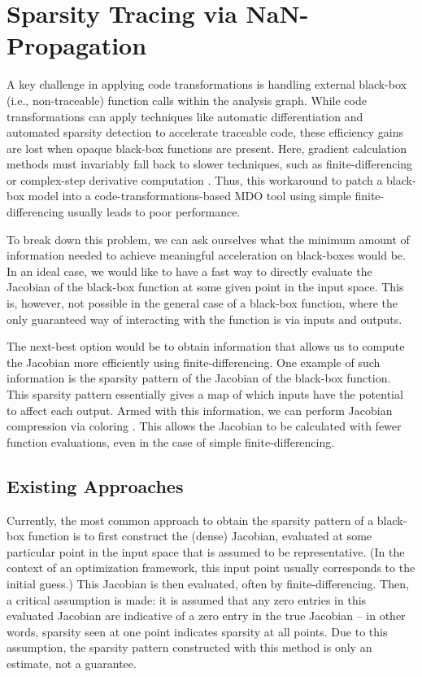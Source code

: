 \chapter{Sparsity Tracing via NaN-Propagation}
\label{sec:nan_propagation}

A key challenge in applying code transformations is handling external black-box (i.e., non-traceable) function calls within the analysis graph. While code transformations can apply techniques like automatic differentiation and automated sparsity detection to accelerate traceable code, these efficiency gains are lost when opaque black-box functions are present. Here, gradient calculation methods must invariably fall back to slower techniques, such as finite-differencing or complex-step derivative computation \cite{martins_complexstep_2003}. Thus, this workaround to patch a black-box model into a code-transformations-based MDO tool using simple finite-differencing usually leads to poor performance.

To break down this problem, we can ask ourselves what the minimum amount of information needed to achieve meaningful acceleration on black-boxes would be. In an ideal case, we would like to have a fast way to directly evaluate the Jacobian of the black-box function at some given point in the input space. This is, however, not possible in the general case of a black-box function, where the only guaranteed way of interacting with the function is via inputs and outputs.

The next-best option would be to obtain information that allows us to compute the Jacobian more efficiently using finite-differencing. One example of such information is the sparsity pattern of the Jacobian of the black-box function. This sparsity pattern essentially gives a map of which inputs have the potential to affect each output. Armed with this information, we can perform Jacobian compression via coloring \cite{gebremedhin_efficient_2009, gebremedhin_what_2005}. This allows the Jacobian to be calculated with fewer function evaluations, even in the case of simple finite-differencing.


\section{Existing Approaches}
\label{sec:nan-existing-methods}

Currently, the most common approach to obtain the sparsity pattern of a black-box function is to first construct the (dense) Jacobian, evaluated at some particular point in the input space that is assumed to be representative. (In the context of an optimization framework, this input point usually corresponds to the initial guess.) This Jacobian is then evaluated, often by finite-differencing. Then, a critical assumption is made: it is assumed that any zero entries in this evaluated Jacobian are indicative of a zero entry in the true Jacobian -- in other words, sparsity seen at one point indicates sparsity at all points. Due to this assumption, the sparsity pattern constructed with this method is only an estimate, not a guarantee.

